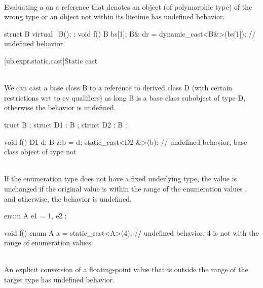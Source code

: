 \pnum
{} \\
Evaluating a  on a reference that
denotes an object (of polymorphic type) of the wrong type or an object
not within its lifetime has undefined behavior.

\pnum
\begin{example}
\begin{codeblock}
struct B { virtual ~B(); };
void f() {
  B bs[1];
  B& dr = dynamic_cast<B&>(bs[1]);  // undefined behavior
}
\end{codeblock}
\end{example}

[ub.expr.static.cast]{Static cast}

\pnum
{} \\
We can cast a base class B to a reference to derived class D (with certain restrictions wrt to cv qualifiers)
as long B is a base class subobject of type D, otherwise the behavior is undefined.

\pnum
\begin{example}
\begin{codeblock}
truct B {};
struct D1 : B {};
struct D2 : B {};

void f() {
  D1 d;
  B &b = d;
  static_cast<D2 &>(b); // undefined behavior, base class object of type  not 
}
\end{codeblock}
\end{example}

\pnum
{} \\
If the enumeration type does not have a fixed underlying
type, the value is unchanged if the original value is within the range of the enumeration values , and
otherwise, the behavior is undefined.

\pnum
\begin{example}
\begin{codeblock}
enum A { e1 = 1, e2 };

void f() {
  enum A a = static_cast<A>(4); // undefined behavior, 4 is not with the range of enumeration values
}
\end{codeblock}
\end{example}

\pnum
{} \\
An explicit conversion of a
floating-point value that is outside the range of the
target type has undefined behavior.

